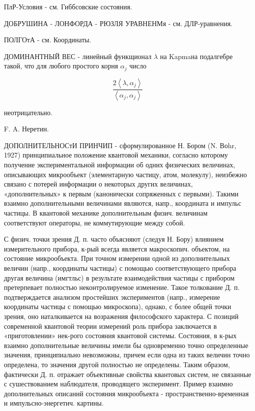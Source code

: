 \documentclass[10pt]{article}
\begin{document}
ПлР-Условия - см. Гиббсовские состояния.



ДОБРУШИНА - ЛОНФОРДА - РЮЗЛЯ УРАВНЕНМя - см. ДЛР-уравнения.



ПОЛГОтА - см. Координаты.



ДОМИНАНТНЫЙ ВЕС - линейный функщионал $\lambda$ на Kapmaна подалгебре такой, что для любого простого корня $\alpha_{j}$ число



\[

\frac{2\left\langle\lambda, \alpha_{j}\right\rangle}{\left\langle\alpha_{j}, \alpha_{j}\right\rangle}

\]



неотрицательно.



F. A. Неретин.



ДОПОЛНИТЕЛЬНОСтИ ПРИНЧИП - сформулированное Н. Бором (N. Воhr, 1927) принципиальное положение квантовой механики, согласно которому получение экспериментальной информации об одних физических величинах, описывающих микрообъект (элементарную частицу, атом, молекулу), неизбежно связано с потерей информации о некоторых других величинах, «дополнительных» к первым (канонически сопряженных с первыми). Такими взаимно дополнительными величинами являются, напр., координата и импульс частицы. В квантовой механике дополнительным физич. величинам соответствуют операторы, не коммутирующие между собой.



С физич. точки зрения Д. п. часто объясняют (следуя Н. Бору) влиянием измерительного прибора, к-рый всегда является макроскопич. объектом, на состояние микрообъекта. При точном измерении одной из дополнительных величин (напр., координаты частицы) с помощью соответствующего прибора другая величина (имгтльс) в результате взаимодействия частицы с прибором претерпевает полностью неконтролируемое изменение. Такое толкование Д. п. подтверждается анализом простейших экспериментов (напр., измерение координаты частицы с помощью микроскопа), однако, с более общей точки зрения, оно наталкивается на возражения философского характера. С позиций современной квантовой теории измерений роль прибора заключается в «приготовлении» нек-рого состояния квантовой системы. Состояния, в к-рых взаимно дополнительные величины имели бы одновременно точно определенные значения, принципиально невозможны, причем если одна из таких величин точно определена, то значения другой полностью не определены. Таким образом, фактически Д. п. отражает объективные свойства квантовых систем, не связанные с сушествованием наблюдателя, проводящего эксперимент. Пример взаимно дополнительных описаний состояния микрообъекта - пространственно-временная и импульсно-энергетич. картины.
\end{document}
